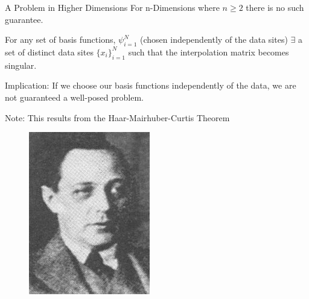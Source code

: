 \documentclass[12pt,t]{beamer}
\newcommand{\subt}[1]{{\footnotesize \color{subtitle} {#1}}}
\begin{document}
\begin{frame}{A Problem in Higher Dimensions}
For n-Dimensions where $n\geq 2$ there is no such guarantee.
\bigskip
\pause

For any set of basis functions, $\psi_{i=1}^N$ (chosen independently of the data sites) $\exists$ a set of distinct data sites $\{x_i\}_{i=1}^N$
such that the interpolation matrix becomes singular. 
\bigskip
\pause

\subt{Implication:}
If we choose our basis functions independently of the data, we are not guaranteed a well-posed problem.
\bigskip

\pause
\subt{Note:}
This results from the Haar-Mairhuber-Curtis Theorem
\begin{figure}[!htb]
  \includegraphics[width=\linewidth]{Haar.jpg}
\endminipage\hfill
{}

\end{figure}
\end{frame}
\end{document}
